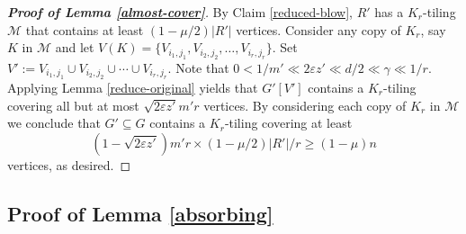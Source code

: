 \documentclass[11pt, a4paper]{article}
\newtheorem{lemma}[theorem]{Lemma}
\theoremstyle{definition}
\newcommand{\eps}{\varepsilon}
\newcommand{\<}{\subseteq}
\begin{document}
\begin{proof}[\bf Proof of Lemma \ref{almost-cover}]
By Claim \ref{reduced-blow}, $R'$ has a $K_r$-tiling $\mathcal{M}$ that contains at least $(1-\mu/2)|R'|$ vertices. Consider any copy of $K_r$, say $K$ in $\mathcal{M}$ and let $V(K)=\{V_{i_1,j_1},V_{i_2,j_2},\ldots, V_{i_r,j_r} \}$. Set $V':=V_{i_1,j_1}\cup V_{i_2,j_2}\cup \cdots\cup V_{i_r,j_r}$. Note that $0<{1}/{m'}\ll 2\eps  z'\ll {d}/{2}\ll \gamma \ll 1/r$. Applying Lemma \ref{reduce-original} yields that  $G'[V']$ contains a $K_r$-tiling covering all but at most $\sqrt{2\eps  z'}m'r$ vertices. By considering each copy of $K_r$ in $\mathcal{M}$ we conclude that $G'\subseteq G$ contains a $K_r$-tiling covering at least 
$$
(1-\sqrt{2\eps  z'})m'r\times (1-\mu/2)|R'|/r\geq (1-\mu)n
$$
vertices, as desired. 
\end{proof}

\subsection{Proof of Lemma \ref{absorbing}}\label{section4.3}
\end{document}
